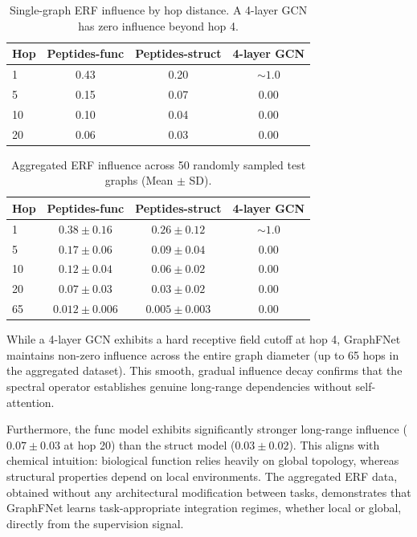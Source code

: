 \documentclass[10pt]{article}
\begin{document}
\begin{table}[t]
\caption{Single-graph ERF influence by hop distance. A 4-layer GCN has zero influence beyond hop 4.}
\label{tab:erf_single}
\centering
\begin{tabular}{lccc}
\toprule
\textbf{Hop} & \textbf{Peptides-func} & \textbf{Peptides-struct} & \textbf{4-layer GCN} \\
\midrule
1  & 0.43 & 0.20 & ${\sim}1.0$ \\
5  & 0.15 & 0.07 & 0.00        \\
10 & 0.10 & 0.04 & 0.00        \\
20 & 0.06 & 0.03 & 0.00        \\
\bottomrule
\end{tabular}
\end{table}

\begin{table}[t]
\caption{Aggregated ERF influence across 50 randomly sampled test graphs (Mean $\pm$ SD).}
\label{tab:erf_aggregate}
\centering
\begin{tabular}{lccc}
\toprule
\textbf{Hop} & \textbf{Peptides-func} & \textbf{Peptides-struct} & \textbf{4-layer GCN} \\
\midrule
1  & $0.38 \pm 0.16$ & $0.26 \pm 0.12$ & ${\sim}1.0$ \\
5  & $0.17 \pm 0.06$ & $0.09 \pm 0.04$ & 0.00        \\
10 & $0.12 \pm 0.04$ & $0.06 \pm 0.02$ & 0.00        \\
20 & $0.07 \pm 0.03$ & $0.03 \pm 0.02$ & 0.00        \\
65 & $0.012 \pm 0.006$ & $0.005 \pm 0.003$ & 0.00        \\
\bottomrule
\end{tabular}
\end{table}

While a 4-layer GCN exhibits a hard receptive field cutoff at hop 4, GraphFNet maintains non-zero influence across the entire graph diameter (up to 65 hops in the aggregated dataset). This smooth, gradual influence decay confirms that the spectral operator establishes genuine long-range dependencies without self-attention.

Furthermore, the func model exhibits significantly stronger long-range influence ($0.07 \pm 0.03$ at hop 20) than the struct model ($0.03 \pm 0.02$). This aligns with chemical intuition: biological function relies heavily on global topology, whereas structural properties depend on local environments. The aggregated ERF data, obtained without any architectural modification between tasks, demonstrates that GraphFNet learns task-appropriate integration regimes, whether local or global, directly from the supervision signal.
\end{document}
